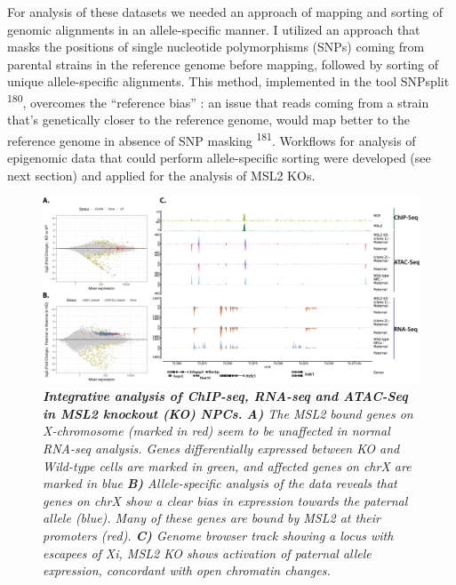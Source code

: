 \documentclass[11pt,twoside]{MPIthesis}
\theoremstyle{definition}
\theoremstyle{definition}
\theoremstyle{definition}
\theoremstyle{remark}
\begin{document}
For analysis of these datasets we needed an approach of mapping and
sorting of genomic alignments in an allele-specific manner. I utilized
an approach that masks the positions of single nucleotide polymorphisms
(SNPs) coming from parental strains in the reference genome before
mapping, followed by sorting of unique allele-specific alignments. This
method, implemented in the tool SNPsplit \textsuperscript{180},
overcomes the ``reference bias'' : an issue that reads coming from a
strain that's genetically closer to the reference genome, would map
better to the reference genome in absence of SNP masking
\textsuperscript{181}. Workflows for analysis of epigenomic data that
could perform allele-specific sorting were developed (see next section)
and applied for the analysis of MSL2 KOs.
\begin{figure}

{\centering \includegraphics[width=1\linewidth,height=0.4\textheight]{figures/results_fig7} 

}

\caption[Integrative analysis of ChIP-seq, RNA-seq and ATAC-Seq in MSL2 knockout (KO) NPCs]{\emph{\textbf{Integrative analysis of ChIP-seq, RNA-seq and
ATAC-Seq in MSL2 knockout (KO) NPCs.} \textbf{A)} The MSL2 bound genes
on X-chromosome (marked in red) seem to be unaffected in normal RNA-seq
analysis. Genes differentially expressed between KO and Wild-type cells
are marked in green, and affected genes on chrX are marked in blue
\textbf{B)} Allele-specific analysis of the data reveals that genes on
chrX show a clear bias in expression towards the paternal allele (blue).
Many of these genes are bound by MSL2 at their promoters (red).
\textbf{C)} Genome browser track showing a locus with escapees of Xi,
MSL2 KO shows activation of paternal allele expression, concordant with
open chromatin changes.}}\label{fig:unnamed-chunk-12}
\end{figure}
\end{document}
